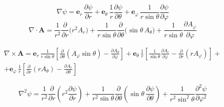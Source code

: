 \begin{tcolorbox}[title={\normalsize \textbf{Coordinate sferiche} \ $(r,\theta,\varphi)$}]
\[
\nabla \psi = \mathbf e_r\,\frac{\partial \psi}{\partial r}
            + \mathbf e_\theta\,\frac{1}{r}\frac{\partial \psi}{\partial \theta}
            + \mathbf e_\varphi\,\frac{1}{r\sin\theta}\frac{\partial \psi}{\partial \varphi}
\]
\[
\nabla\!\cdot\!\mathbf A =
\frac{1}{r^2}\frac{\partial}{\partial r}\!\big(r^2 A_r\big)
+ \frac{1}{r\sin\theta}\frac{\partial}{\partial \theta}\!\big(\sin\theta\, A_\theta\big)
+ \frac{1}{r\sin\theta}\frac{\partial A_\varphi}{\partial \varphi}
\]

\begin{align*}
    \nabla\!\times\!\mathbf A =
\mathbf e_r\,\frac{1}{r\sin\theta}\!\left[\frac{\partial}{\partial \theta}(A_\varphi\sin\theta)-\frac{\partial A_\theta}{\partial \varphi}\right]
+ \mathbf e_\theta\,\frac{1}{r}\!\left[\frac{1}{\sin\theta}\frac{\partial A_r}{\partial \varphi}-\frac{\partial}{\partial r}(rA_\varphi)\right] + \\ 
+ \mathbf e_\varphi\,\frac{1}{r}\!\left[\frac{\partial}{\partial r}(rA_\theta)-\frac{\partial A_r}{\partial \theta}\right] \quad \quad \quad \quad \quad \quad \quad \quad \quad  \quad
\end{align*}



\[
\nabla^2\psi=\frac{1}{r^2}\frac{\partial}{\partial r}\!\left(r^2\frac{\partial \psi}{\partial r}\right)
            + \frac{1}{r^2\sin\theta}\frac{\partial}{\partial \theta}\!\left(\sin\theta\,\frac{\partial \psi}{\partial \theta}\right)
            + \frac{1}{r^2\sin^2\theta}\frac{\partial^2\psi}{\partial \varphi^2}
\]
\end{tcolorbox}